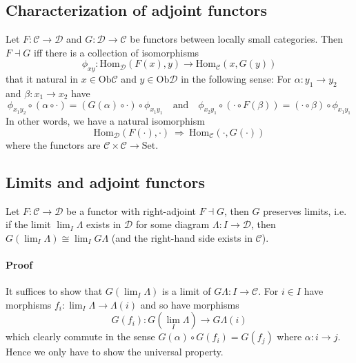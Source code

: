 \subsection{Characterization of adjoint functors}
Let $F: \mathcal{C} \to \mathcal{D}$ and $G: \mathcal{D} \to \mathcal{C}$ be functors between locally small categories.
Then $F \dashv G$ iff there is a collection of isomorphisms
\begin{equation*}
    \phi_{xy}: \mathrm{Hom}_{\mathcal{D}}(F(x), y) \to \mathrm{Hom}_{\mathcal{C}}(x, G(y))
\end{equation*}
that it natural in $x \in \mathrm{Ob}\mathcal{C}$ and $y \in \mathrm{Ob}\mathcal{D}$ in the following sense:
For $\alpha: y_1 \to y_2$ and $\beta: x_1 \to x_2$ have
\begin{equation*}
    \phi_{x_1 y_2} \circ (\alpha \circ \cdot) = (G(\alpha) \circ \cdot) \circ \phi_{x_1 y_1} \quad \text{and} \quad \phi_{x_2 y_1} \circ (\cdot \circ F(\beta)) = (\cdot \circ \beta) \circ \phi_{x_1 y_1}
\end{equation*}
In other words, we have a natural isomorphism
\begin{equation*}
    \mathrm{Hom}_{\mathcal{D}}(F(\cdot), \cdot) \ \Rightarrow \ \mathrm{Hom}_{\mathcal{C}}(\cdot, G(\cdot))
\end{equation*}
where the functors are $\mathcal{C} \times \mathcal{C} \to \mathrm{Set}$.

\subsection{Limits and adjoint functors}
Let $F: \mathcal{C} \to \mathcal{D}$ be a functor with right-adjoint $F \dashv G$, then $G$ preserves limits, i.e. if the limit $\lim_I \Lambda$ exists in $\mathcal{D}$ for some diagram $\Lambda: I \to \mathcal{D}$, then $G(\lim_I \Lambda) \cong \lim_I G \Lambda$ (and the right-hand side exists in $\mathcal{C}$). 
\paragraph{Proof}
It suffices to show that $G(\lim_I \Lambda)$ is a limit of $G \Lambda: I \to \mathcal{C}$.
For $i \in I$ have morphisms $f_i: \lim_I \Lambda \to \Lambda(i)$ and so have morphisms
\begin{equation*}
    G(f_i): G(\lim_I \Lambda) \to G \Lambda(i)
\end{equation*}
which clearly commute in the sense $G(\alpha) \circ G(f_i) = G(f_j)$ where $\alpha: i \to j$.
Hence we only have to show the universal property.

